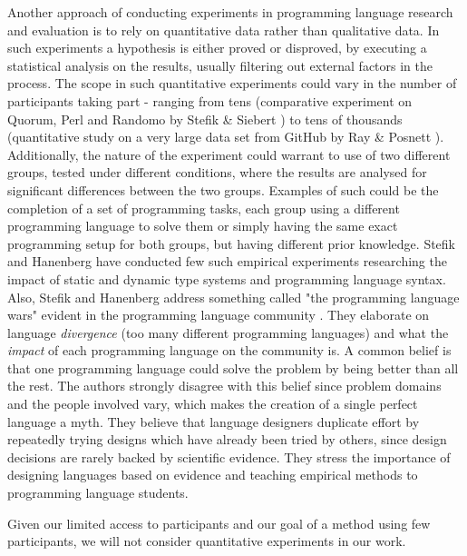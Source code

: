 Another approach of conducting experiments in programming language research and evaluation is to rely on quantitative data rather than qualitative data. In such experiments a hypothesis is either proved or disproved, by executing a statistical analysis on the results, usually filtering out external factors in the process. The scope in such quantitative experiments could vary in the number of participants taking part - ranging from tens (comparative experiment on Quorum, Perl and Randomo by Stefik \& Siebert \cite{QuorumRandomo}) to tens of thousands (quantitative study on a very large data set from GitHub by Ray \& Posnett \cite{GitHubExperiment}). Additionally, the nature of the experiment could warrant to use of two different groups, tested under different conditions, where the results are analysed for significant differences between the two groups. Examples of such could be the completion of a set of programming tasks, each group using a different programming language to solve them or simply having the same exact programming setup for both groups, but having different prior knowledge. Stefik and Hanenberg have conducted few such empirical experiments \cite{StaticTypes}\cite{ProgLangSyntax} researching the impact of static and dynamic type systems and programming language syntax. Also, Stefik and Hanenberg address something called "the programming language wars" evident in the programming language community \cite{ProgrammingWars}. They elaborate on language \textit{divergence} (too many different programming languages) and what the \textit{impact} of each programming language on the community is. A common belief is that one programming language could solve the problem by being better than all the rest. The authors strongly disagree with this belief since problem domains and the people involved vary, which makes the creation of a single perfect language a myth. They believe that language designers duplicate effort by repeatedly trying designs which have already been tried by others, since design decisions are rarely backed by scientific evidence. They stress the importance of designing languages based on evidence and teaching empirical methods to programming language students.

Given our limited access to participants and our goal of a method using few participants, we will not consider quantitative experiments in our work.

